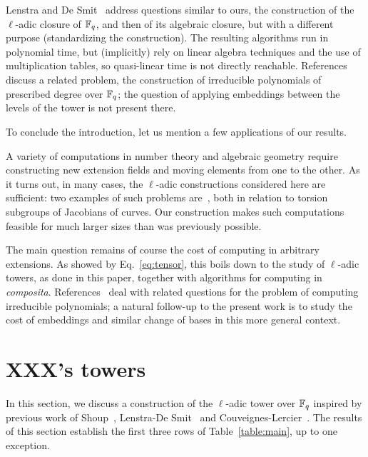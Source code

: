 \documentclass{sig-alternate}
\begin{document}
Lenstra and De Smit~\cite{lenstra+desmit08-stdmodels} address
questions similar to ours, the construction of the $\ell$-adic closure
of $\mathbb{F}_q$, and then of its algebraic closure, but with a different
purpose (standardizing the construction). The resulting algorithms run
in polynomial time, but (implicitly) rely on linear algebra techniques
and the use of multiplication tables, so quasi-linear time is not
directly reachable.
References~\cite{Shoup90,shoup94,couveignes+lercier11} discuss a
related problem, the construction of irreducible polynomials of
prescribed degree over $\mathbb{F}_q$; the question of applying embeddings
between the levels of the tower is not present there.

To conclude the introduction, let us mention a few applications of our
results. 

A variety of computations in number theory and algebraic geometry
require constructing new extension fields and moving elements from one
to the other. As it turns out, in many cases, the $\ell$-adic
constructions considered here are sufficient: two examples of such
problems are~\cite{df10,GaSc12}, both in relation to torsion subgroups
of Jacobians of curves. Our construction makes such computations
feasible for much larger sizes than was previously possible.

The main question remains of course the cost of computing in arbitrary
extensions. As showed by Eq.~\eqref{eq:tensor}, this boils down to the
study of $\ell$-adic towers, as done in this paper, together with
algorithms for computing in \emph{composita}.
References~\cite{Shoup90,shoup94,couveignes+lercier11} deal with
related questions for the problem of computing irreducible polynomials;
a natural follow-up to the present work is to study the cost of
embeddings and similar change of bases in this more general context.


\section{XXX's towers}
\label{sec:LDtower}

In this section, we discuss a construction of the $\ell$-adic tower
over $\mathbb{F}_q$ inspired by previous work of Shoup~\cite{Shoup90,shoup94},
Lenstra-De Smit~\cite{lenstra+desmit08-stdmodels} and
Couveignes-Lercier~\cite{couveignes+lercier11}. The results of this
section establish the first three rows of Table~\ref{table:main}, up
to one exception.
\end{document}
